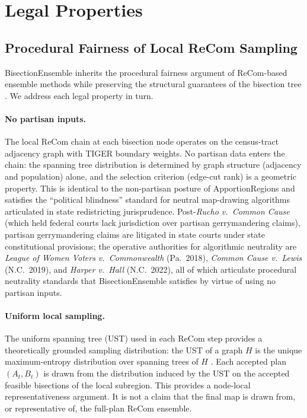 \section{Legal Properties}
\label{sec:legal}

\subsection{Procedural Fairness of Local ReCom Sampling}
\label{sec:legal:procedural}

BisectionEnsemble inherits the procedural fairness argument of ReCom-based
ensemble methods \citep{deford2021recombination, duchin2021report} while
preserving the structural guarantees of the bisection tree
\citep{dellaLibera2026apportion}. We address each legal property in turn.

\paragraph{No partisan inputs.}
The local ReCom chain at each bisection node operates on the census-tract
adjacency graph with TIGER boundary weights. No partisan data enters the
chain: the spanning tree distribution is determined by graph structure
(adjacency and population) alone, and the selection criterion (edge-cut rank)
is a geometric property. This is identical to the non-partisan posture of
ApportionRegions \citep{dellaLibera2026apportion} and satisfies the
``political blindness'' standard for neutral map-drawing algorithms articulated
in state redistricting jurisprudence. Post-\emph{Rucho v.\ Common Cause}
\citep{rucho2019} (which held federal courts lack jurisdiction over partisan
gerrymandering claims), partisan gerrymandering claims are litigated in state
courts under state constitutional provisions; the operative authorities for
algorithmic neutrality are \emph{League of Women Voters v.\ Commonwealth}
(Pa.\ 2018), \emph{Common Cause v.\ Lewis} (N.C.\ 2019), and \emph{Harper v.\
Hall} (N.C.\ 2022), all of which articulate procedural neutrality standards
that BisectionEnsemble satisfies by virtue of using no partisan inputs.

\paragraph{Uniform local sampling.}
The uniform spanning tree (UST) used in each ReCom step provides a
theoretically grounded sampling distribution: the UST of a graph $H$ is the
unique maximum-entropy distribution over spanning trees of $H$
\citep{aldous1990random, wilson1996generating}. Each accepted plan
$(A_t, B_t)$ is drawn from the distribution induced by the UST on the
accepted feasible bisections of the local subregion. This provides a
node-local representativeness argument. It is not a claim that the final map is
drawn from, or representative of, the full-plan ReCom ensemble.

